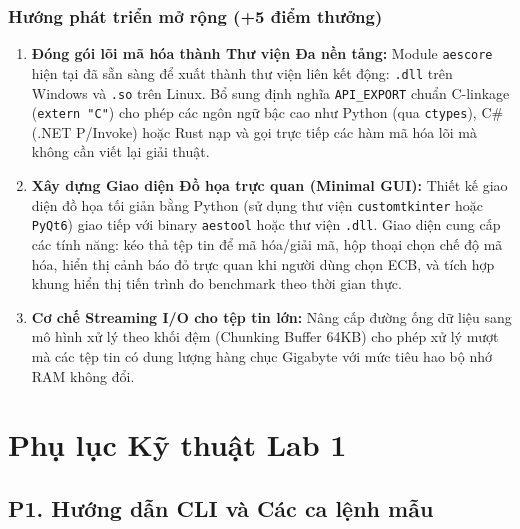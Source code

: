 \documentclass[12pt, a4paper]{report}
\begin{document}
\subsection{Hướng phát triển mở rộng (+5 điểm thưởng)}
\begin{enumerate}
    \item \textbf{Đóng gói lõi mã hóa thành Thư viện Đa nền tảng:} Module \texttt{aescore} hiện tại đã sẵn sàng để xuất thành thư viện liên kết động: \texttt{.dll} trên Windows và \texttt{.so} trên Linux. Bổ sung định nghĩa \texttt{API\_EXPORT} chuẩn C-linkage (\texttt{extern "C"}) cho phép các ngôn ngữ bậc cao như Python (qua \texttt{ctypes}), C\# (.NET P/Invoke) hoặc Rust nạp và gọi trực tiếp các hàm mã hóa lõi mà không cần viết lại giải thuật.
    \item \textbf{Xây dựng Giao diện Đồ họa trực quan (Minimal GUI):} Thiết kế giao diện đồ họa tối giản bằng Python (sử dụng thư viện \texttt{customtkinter} hoặc \texttt{PyQt6}) giao tiếp với binary \texttt{aestool} hoặc thư viện \texttt{.dll}. Giao diện cung cấp các tính năng: kéo thả tệp tin để mã hóa/giải mã, hộp thoại chọn chế độ mã hóa, hiển thị cảnh báo đỏ trực quan khi người dùng chọn ECB, và tích hợp khung hiển thị tiến trình đo benchmark theo thời gian thực.
    \item \textbf{Cơ chế Streaming I/O cho tệp tin lớn:} Nâng cấp đường ống dữ liệu sang mô hình xử lý theo khối đệm (Chunking Buffer 64KB) cho phép xử lý mượt mà các tệp tin có dung lượng hàng chục Gigabyte với mức tiêu hao bộ nhớ RAM không đổi.
\end{enumerate}

\appendix
\chapter{Phụ lục Kỹ thuật Lab 1}
\label{app:lab1}

\section*{P1. Hướng dẫn CLI và Các ca lệnh mẫu}
\end{document}
